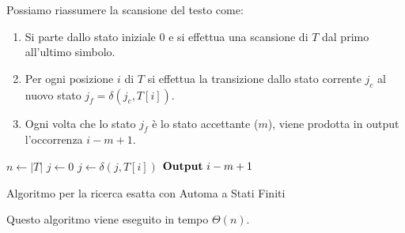 Possiamo riassumere la scansione del testo come:
\begin{enumerate}
    \item Si parte dallo stato iniziale $0$ e si effettua una scansione di $T$
          dal primo all'ultimo simbolo.
    \item Per ogni posizione $i$ di $T$ si effettua la transizione dallo stato
          corrente $j_c$ al nuovo stato $j_f = \delta(j_c, T[i])$.
    \item Ogni volta che lo stato $j_f$ è lo stato accettante ($m$), viene prodotta
          in output l'occorrenza $i - m + 1$.
\end{enumerate}
\begin{algorithm}
    \begin{algorithmic}
        \State $n \gets |T|$
        \State $j \gets 0$
        \State $j \gets \delta(j, T[i])$
        \State $\text{\textbf{Output}} \ i - m + 1$
        \EndIf
        \EndFor
        \EndFunction
    \end{algorithmic}
    \caption{Algoritmo per la ricerca esatta con Automa a Stati Finiti}
\end{algorithm}
Questo algoritmo viene eseguito in tempo $\Theta(n)$.
